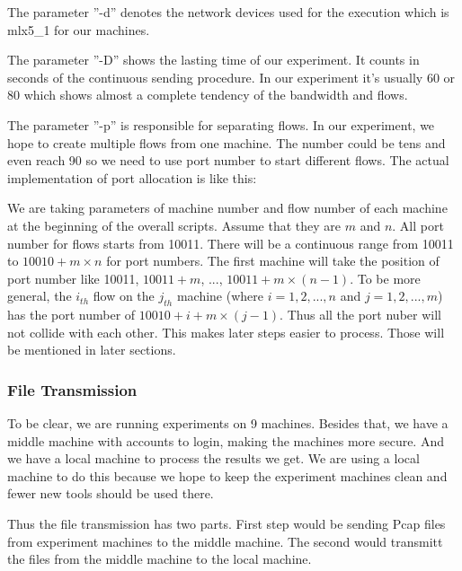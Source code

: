 \documentclass{article}
\begin{document}
The parameter ''-d'' denotes the network devices used for the execution which is mlx5\_1 for our machines.

The parameter ''-D'' shows the lasting time of our experiment. It counts in seconds of the continuous sending procedure.
In our experiment it's usually 60 or 80 which shows almost a complete tendency of the bandwidth and flows.

The parameter ''-p'' is responsible for separating flows. In our experiment, we hope to create multiple flows from one machine.
The number could be tens and even reach 90 so we need to use port number to start different flows.
The actual implementation of port allocation is like this: 

We are taking parameters of machine number and flow number of each machine at the beginning of the overall scripts.
Assume that they are $m$ and $n$.
All port number for flows starts from 10011. There will be a continuous range from 10011 to $10010+m\times n$ for port numbers.
The first machine will take the position of port number like 10011, $10011+m$, ..., $10011+m\times(n-1)$.
To be more general, the $i_{th}$ flow on the $j_{th}$ machine (where $i=1,2,...,n$ and $j=1,2,...,m$) has the port number of
$10010+i+m\times(j-1)$.
Thus all the port nuber will not collide with each other. This makes later steps easier to process.
Those will be mentioned in later sections.

\subsubsection{File Transmission}
To be clear, we are running experiments on 9 machines.
Besides that, we have a middle machine with accounts to login, making the machines more secure.
And we have a local machine to process the results we get. We are using a local machine to do this because
we hope to keep the experiment machines clean and fewer new tools should be used there.

Thus the file transmission has two parts. First step would be sending Pcap files from experiment machines to the middle machine.
The second would transmitt the files from the middle machine to the local machine.
\end{document}
